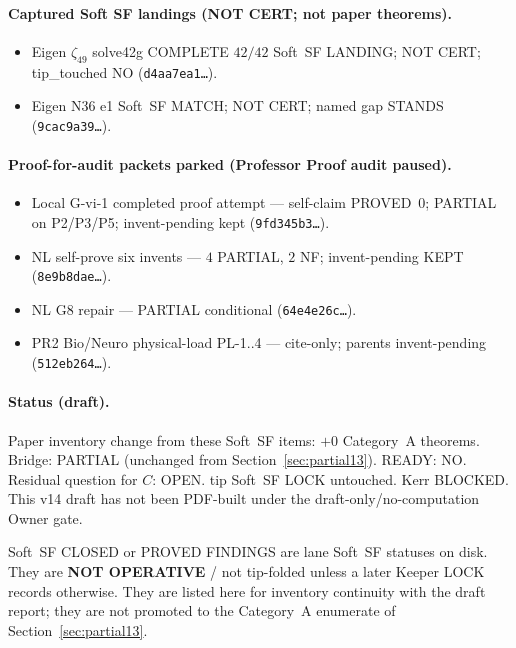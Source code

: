 \paragraph{Captured Soft SF landings (NOT CERT; not paper theorems).}
\begin{itemize}
\item Eigen $\zeta_{49}$ solve42g COMPLETE $42/42$ Soft~SF LANDING; NOT CERT; tip\_touched NO (\texttt{d4aa7ea1\ldots}).
\item Eigen N36 e1 Soft~SF MATCH; NOT CERT; named gap STANDS (\texttt{9cac9a39\ldots}).
\end{itemize}

\paragraph{Proof-for-audit packets parked (Professor Proof audit paused).}
\begin{itemize}
\item Local G-vi-1 completed proof attempt --- self-claim PROVED~$0$; PARTIAL on P2/P3/P5; invent-pending kept (\texttt{9fd345b3\ldots}).
\item NL self-prove six invents --- $4$ PARTIAL, $2$ NF; invent-pending KEPT (\texttt{8e9b8dae\ldots}).
\item NL G8 repair --- PARTIAL conditional (\texttt{64e4e26c\ldots}).
\item PR2 Bio/Neuro physical-load PL-1..4 --- cite-only; parents invent-pending (\texttt{512eb264\ldots}).
\end{itemize}

\paragraph{Status (draft).}
Paper inventory change from these Soft~SF items: $+0$ Category~A theorems.
Bridge: PARTIAL (unchanged from Section~\ref{sec:partial13}). READY: NO.
Residual question for $C$: OPEN. tip Soft~SF LOCK untouched. Kerr BLOCKED.
This v14 draft has not been PDF-built under the draft-only/no-computation Owner gate.

\begin{remark}
Soft~SF CLOSED or PROVED FINDINGS are lane Soft~SF statuses on disk. They are \textbf{NOT OPERATIVE} / not tip-folded unless a later Keeper LOCK records otherwise.
They are listed here for inventory continuity with the draft report; they are not promoted to the Category~A enumerate of Section~\ref{sec:partial13}.
\end{remark}
